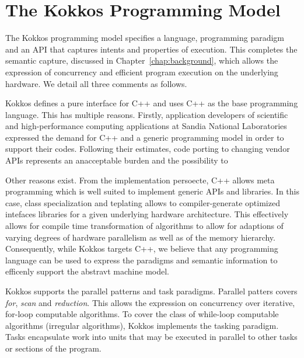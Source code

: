 \section{The Kokkos Programming Model}\label{chap:kokkosPM}

The Kokkos programming model specifies a language, programming paradigm and an API that captures intents and properties of execution. This completes the semantic capture, discussed in Chapter~\ref{chap:background}, which allows the expression of concurrency and efficient program execution on the underlying hardware. We detail all three comments as follows.

Kokkos defines a pure interface for C++ and uses C++ as the base programming language. This has multiple reasons. Firstly, application developers of scientific and high-performance computing applications at Sandia National Laboratories expressed the demand for C++ and a generic programming model in order to support their codes. Following their estimates, code porting to changing vendor APIs represents an anacceptable burden and the possibility to  

Other reasons exist. From the implementation persoecte, C++ allows meta programming which is well suited to implement generic APIs and libraries. In this case, class specialization and teplating allows to compiler-generate optimized intefaces libraries for a given underlying hardware architecture. This effectively allows for compile time transformation of algorithms to allow for adaptions of varying degrees of hardware parallelism as well as of the memory hierarchy.
Consequently, while Kokkos targets C++, we believe that any programming language can be used to express the paradigms and semantic information to efficenly support the abstravt machine model.

Kokkos supports the parallel patterns and task paradigms. Parallel patters covers \emph{for}, \emph{ scan} and \emph{reduction}. This allows the expression on concurrency over iterative, for-loop computable algorithms. To cover the class of while-loop computable algorithms (irregular algorithms), Kokkos implements the tasking paradigm. Tasks encapsulate work into units that may be executed in parallel to other tasks or sections of the program.

